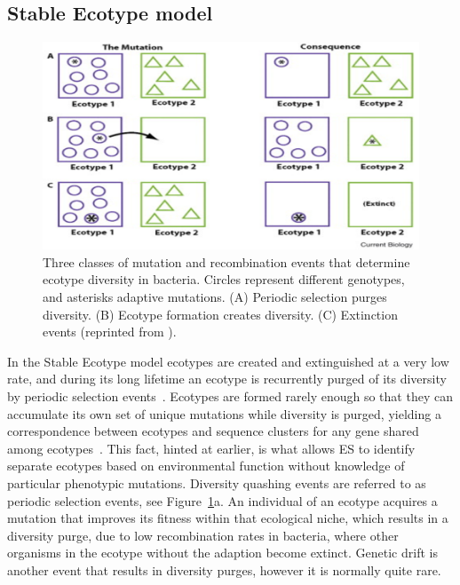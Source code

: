 \subsection*{Stable Ecotype model}

\begin{figure}[h!]
 \centering
 \label{fig:StableEvents}
 \includegraphics{images/StableEcotypeEvents-CH2}
 \caption[Events predicted by the Stable Ecotype model \protect\cite{cohan2007systematics}.]{Three classes of mutation and recombination events that determine ecotype diversity in bacteria. Circles represent different genotypes, and asterisks adaptive mutations. (A) Periodic selection purges diversity. (B) Ecotype formation creates diversity. (C) Extinction events (reprinted from \protect\cite{cohan2007systematics}).}
\end{figure}

In the Stable Ecotype model ecotypes are created and extinguished at a very low rate, and during its long lifetime an ecotype is recurrently purged of its diversity by periodic selection events~\cite{cohan2007systematics}.
Ecotypes are formed rarely enough so that they can accumulate its own set of unique mutations while diversity is purged, yielding a correspondence between ecotypes and sequence clusters for any gene shared among ecotypes~\cite{cohan2008origins}.
This fact, hinted at earlier, is what allows ES to identify separate ecotypes based on environmental function without knowledge of particular phenotypic mutations.
Diversity quashing events are referred to as periodic selection events, see Figure~\ref{fig:StableEvents}a.
An individual of an ecotype acquires a mutation that improves its fitness within that ecological niche, which results in a diversity purge, due to low recombination rates in bacteria, where other organisms in the ecotype without the adaption become extinct.
Genetic drift is another event that results in diversity purges, however it is normally quite rare.

